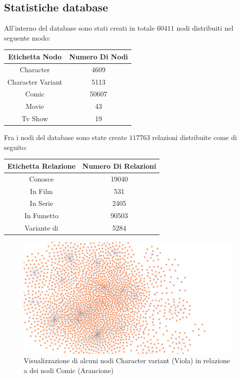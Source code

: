 \documentclass[
12pt, %
a4paper, %
oneside, %
headinclude,footinclude, %
BCOR5mm, %
]{scrartcl}
\begin{document}
\subsection{Statistiche database}
All'interno del database sono stati creati in totale $60411$ nodi distribuiti nel seguente modo: 

\begin{center}
\begin{tabular}{||c c||} 
 \hline
 Etichetta Nodo  & Numero Di Nodi \\ [0.5ex] 
 \hline\hline
	
	Character & 4609 \\ \hline 
	Character Variant & 5113 \\ \hline
	Comic & 50607 \\ \hline
	Movie & 43 \\ \hline
	Tv Show & 19 \\ [0.5ex] \hline 
\end{tabular}
\end{center}
Fra i nodi del database sono state create $117763$ relazioni distribuite come di seguito:
\begin{center}
\begin{tabular}{||c c||} 
 \hline
 Etichetta Relazione  & Numero Di Relazioni \\ [0.5ex] 
 \hline\hline
	Conosce & 19040 \\ \hline 
	In Film & 531 \\ \hline
	In Serie & 2405 \\ \hline
	In Fumetto & 90503 \\ \hline
	Variante di & 5284 \\ [0.5ex] \hline 
\end{tabular}
\end{center}
\begin{figure}[H]
  \includegraphics[scale=0.27]{./Figures/comic-variant.png}
  \caption{Visualizzazione di alcuni nodi Character variant (Viola) in relazione a dei nodi Comic (Arancione)}
\end{figure}
\end{document}
